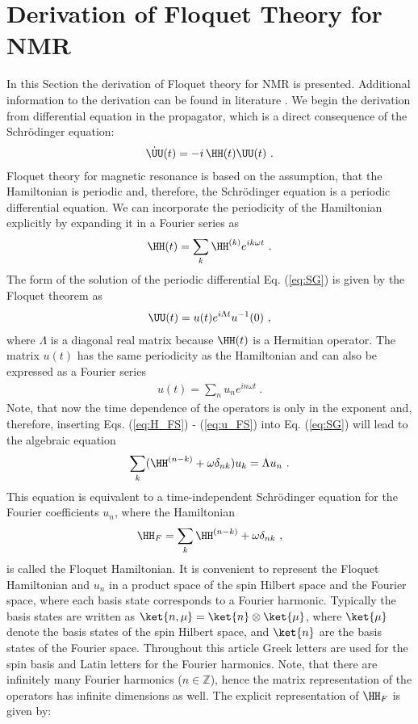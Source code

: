 \section{Derivation of Floquet Theory for NMR}
\enlargethispage{1.5cm}
In this Section the derivation of Floquet theory for NMR is presented. Additional information to the derivation can be found  in literature \cite{Shirley:1965tn,Leskes:2010dx,Ivanov:2021uy}. 
We begin the derivation from differential equation in the propagator, which is a direct consequence of the Schr\"{o}dinger equation:
\begin{align}
\dot{\UU}(t) = -i\,\HH(t) \UU(t)~.
\label{eq:SG}
\end{align}
Floquet theory for magnetic resonance is based on the assumption, that the Hamiltonian is periodic and, therefore, the Schr\"{o}dinger equation is a periodic differential equation.
We can incorporate the periodicity of the Hamiltonian explicitly by expanding it in a Fourier series as
\begin{align}
\HH(t) = \sum_k \HH^{(k)}e^{i k \omega t}~.
\label{eq:H_FS}
\end{align}
The form of the solution of the periodic differential Eq. (\ref{eq:SG}) is given by the Floquet theorem \cite{Floquet:1883vq} as
\begin{align}
\UU(t) = u(t)e^{i \Lambda t}u^{-1}(0)~,
\label{eq:U_Floquet}
\end{align}
where $\Lambda$ is a diagonal real matrix because $\HH(t)$ is a Hermitian operator. The matrix $u(t)$ has the same periodicity as the Hamiltonian and can also be expressed as a Fourier series
\begin{align}
u(t) = \sum_{n} u_n e^{i n\omega t}~.
\label{eq:u_FS}
\end{align}
Note, that now the time dependence of the operators is only in the exponent and, therefore, inserting Eqs. (\ref{eq:H_FS}) - (\ref{eq:u_FS}) into Eq. (\ref{eq:SG}) will lead to the algebraic equation
\begin{align}
\sum_{k} (\HH^{(n-k)} +\omega \delta_{n k}) u_k  = \Lambda u_n~.
\label{eq:eigenvalue_equation_u}
\end{align}
This equation is equivalent to a time-independent Schr\"{o}dinger equation for the Fourier coefficients $u_n$, where the Hamiltonian
\begin{align}
\HH_F = \sum_{k} \HH^{(n-k)} +\omega \delta_{n k}~,
\end{align}
is called the Floquet Hamiltonian. \enlargethispage{1.cm}
It is convenient to represent the Floquet Hamiltonian and $u_n$ in a product space  of the spin Hilbert space and the Fourier space, where each basis state corresponds to a Fourier harmonic. Typically the basis states are written as $\ket{n,\mu}=\ket{n}\otimes\ket{\mu}$, where $\ket{\mu}$ denote the basis states of the spin Hilbert space, and $\ket{n}$ are the basis states of the Fourier space. Throughout this article Greek letters are used for the spin basis and Latin letters for the Fourier harmonics. Note, that there are infinitely many Fourier harmonics ($n\in \mathbb{Z}$), hence the matrix representation of the operators has infinite dimensions as well. The explicit representation of $\HH_F$ \cite{Scholz:2010hq,Leskes:2010dx,Ivanov:2021uy} is given by:

